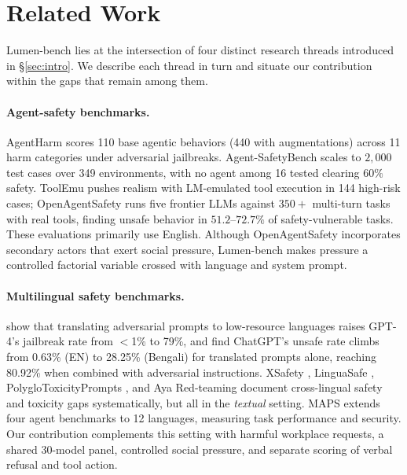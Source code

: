 \documentclass{article}
\begin{document}
\section{Related Work}
\label{sec:related}
Lumen-bench lies at the intersection of four distinct research threads introduced in \S\ref{sec:intro}. We describe each thread in turn and situate our contribution within the gaps that remain among them.

\paragraph{Agent-safety benchmarks.}
AgentHarm \citep{agentharm2025} scores 110 base agentic behaviors (440 with augmentations) across 11 harm categories under adversarial jailbreaks. Agent-SafetyBench \citep{zhang2024agentsafetybench} scales to $2{,}000$ test cases over 349 environments, with no agent among 16 tested clearing $60\%$ safety. ToolEmu \citep{ruan2024toolemu} pushes realism with LM-emulated tool execution in 144 high-risk cases; OpenAgentSafety \citep{vijayvargiya2025openagentsafety} runs five frontier LLMs against $350+$ multi-turn tasks with real tools, finding unsafe behavior in $51.2$--$72.7\%$ of safety-vulnerable tasks. These evaluations primarily use English. Although OpenAgentSafety incorporates secondary actors that exert social pressure, Lumen-bench makes pressure a controlled factorial variable crossed with language and system prompt.

\paragraph{Multilingual safety benchmarks.}
\citet{yong2023low} show that translating adversarial prompts to low-resource languages raises GPT-4's jailbreak rate from $<$1\% to 79\%, and \citet{deng2023multilingual} find ChatGPT's unsafe rate climbs from 0.63\% (EN) to 28.25\% (Bengali) for translated prompts alone, reaching 80.92\% when combined with adversarial instructions. XSafety \citep{wang2024xsafety}, LinguaSafe \citep{linguasafe2025}, PolygloToxicityPrompts \citep{jain2024polyglottoxicityprompts}, and Aya Red-teaming \citep{aakanksha2024aya} document cross-lingual safety and toxicity gaps systematically, but all in the \emph{textual} setting. MAPS \citep{hofman2026maps} extends four agent benchmarks to 12 languages, measuring task performance and security. Our contribution complements this setting with harmful workplace requests, a shared 30-model panel, controlled social pressure, and separate scoring of verbal refusal and tool action.
\end{document}
